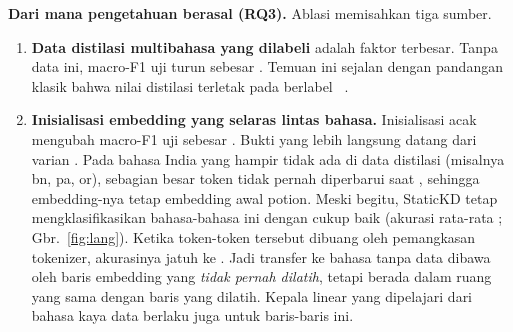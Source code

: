 \textbf{Dari mana pengetahuan  berasal (RQ3).} Ablasi memisahkan tiga sumber.
\begin{enumerate}
  \item \textbf{Data distilasi multibahasa yang dilabeli } adalah faktor terbesar. Tanpa data ini, macro-F1 uji turun sebesar . Temuan ini sejalan dengan pandangan klasik bahwa nilai distilasi terletak pada  berlabel ~\cite{bucilua2006model,ye2022sparse}.
  \item \textbf{Inisialisasi embedding yang selaras lintas bahasa.} Inisialisasi acak mengubah macro-F1 uji sebesar . Bukti yang lebih langsung datang dari varian . Pada bahasa India yang hampir tidak ada di data distilasi (misalnya bn, pa, or), sebagian besar token tidak pernah diperbarui saat , sehingga embedding-nya tetap embedding awal potion. Meski begitu, StaticKD tetap mengklasifikasikan bahasa-bahasa ini dengan cukup baik (akurasi rata-rata ; Gbr.~\ref{fig:lang}). Ketika token-token tersebut dibuang oleh pemangkasan tokenizer, akurasinya jatuh ke . Jadi transfer ke bahasa tanpa data dibawa oleh baris embedding yang \emph{tidak pernah dilatih}, tetapi berada dalam ruang yang sama dengan baris yang dilatih. Kepala linear yang dipelajari dari bahasa kaya data berlaku juga untuk baris-baris ini.


\end{enumerate}
